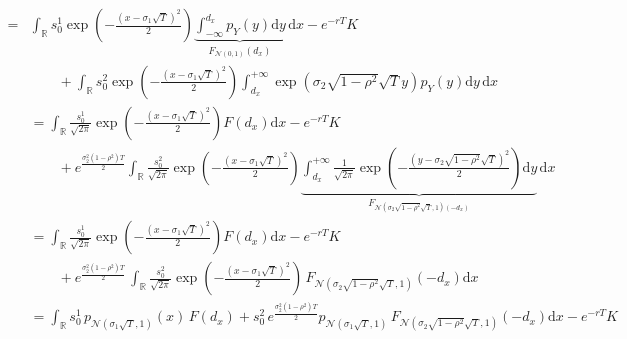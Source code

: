 \documentclass{article}
\newcommand{\N}{\mathscr{N}}
\newcommand{\R}{\mathbb{R}}
\newcommand{\1}{\mathbbm{1}}
\renewcommand{\d}{\mathrm{d}}
\begin{document}
\begin{align*}
      =& \int_\R s_0^1 \exp\left(- \frac{(x - \sigma_1\sqrt{T})^2}{2}\right) \underbrace{\int_{-\infty}^{d_x}p_Y(y) \d y}_{F_{\N(0,1)}(d_x)} \,\d x  - e^{-rT}K\\
      &\qquad+ \int_\R s_0^2 \exp\left(- \frac{(x - \sigma_1\sqrt{T})^2}{2}\right) \int_{d_x}^{+\infty} \exp\left(\sigma_2\sqrt{1-\rho^2}\sqrt{T} y \right) p_Y(y) \d y\, \d x\\
      &= \int_\R \frac{s_0^1}{\sqrt{2\pi}} \exp\left(- \frac{(x - \sigma_1\sqrt{T})^2}{2}\right)F(d_x)\d x  - e^{-rT}K\\
       &\qquad+ e^{\frac{\sigma_2^2 (1-\rho^2)T}{2}}\int_\R \frac{s_0^2}{\sqrt{2\pi}} \exp\left(- \frac{(x - \sigma_1\sqrt{T})^2}{2}\right) \underbrace{\int_{d_x}^{+\infty}\frac{1}{\sqrt{2\pi}} \exp\left(- \frac{(y - \sigma_2\sqrt{1-\rho^2}\sqrt{T})^2}{2}\right)\d y}_{F_{\N{\left(\sigma_2\sqrt{1-\rho^2}\sqrt{T},1\right)}(-{d_x})}}\, \d x\\
      &=  \int_\R \frac{s_0^1}{\sqrt{2\pi}} \exp\left(- \frac{(x - \sigma_1\sqrt{T})^2}{2}\right)F(d_x)\d x - e^{-rT}K\\
      &\qquad + e^{\frac{\sigma_2^2 (1-\rho^2)T}{2}} \,\int_\R \frac{s_0^2}{\sqrt{2\pi}} \exp\left(- \frac{(x - \sigma_1\sqrt{T})^2}{2}\right) \,F_{\N\left(\sigma_2\sqrt{1-\rho^2}\sqrt{T},1\right)}(-d_x)\d x \\
      &=  \int_\R s_0^1 \, p_{\N\left(\sigma_1\sqrt{T},1\right)}(x) \,F(d_x)  + s_0^2\, e^{\frac{\sigma_2^2 (1-\rho^2)T}{2}} p_{\N\left(\sigma_1\sqrt{T},1\right)}\, F_{\N\left(\sigma_2\sqrt{1-\rho^2}\sqrt{T},1\right)}(-d_x) \d x - e^{-rT}K
\end{align*}
\end{document}
